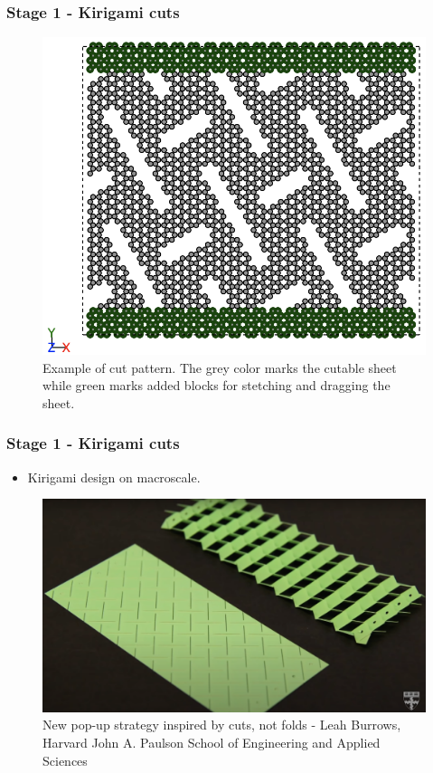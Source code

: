 \documentclass[
	10pt, %
]{beamer}
\begin{document}
\begin{frame}
	\frametitle{Stage 1 - Kirigami cuts}

	\begin{figure}
		\includegraphics[width=0.6\linewidth]{figures/cutpattern.png}
		\caption{Example of cut pattern. The grey color marks the cutable sheet while green marks added blocks for stetching and dragging the sheet.}
	\end{figure}	

\end{frame}


\begin{frame}
	\frametitle{Stage 1 - Kirigami cuts}


	\begin{itemize}
		\item Kirigami design on macroscale.
	\end{itemize}
	\begin{figure}
		\includegraphics[width=0.6\linewidth]{figures/kirigami_pattern_inspiration.png}
		\caption{New pop-up strategy inspired by cuts, not folds - Leah Burrows, Harvard John A. Paulson School of Engineering and Applied Sciences }
	\end{figure}	

	
\end{frame}
\end{document}
